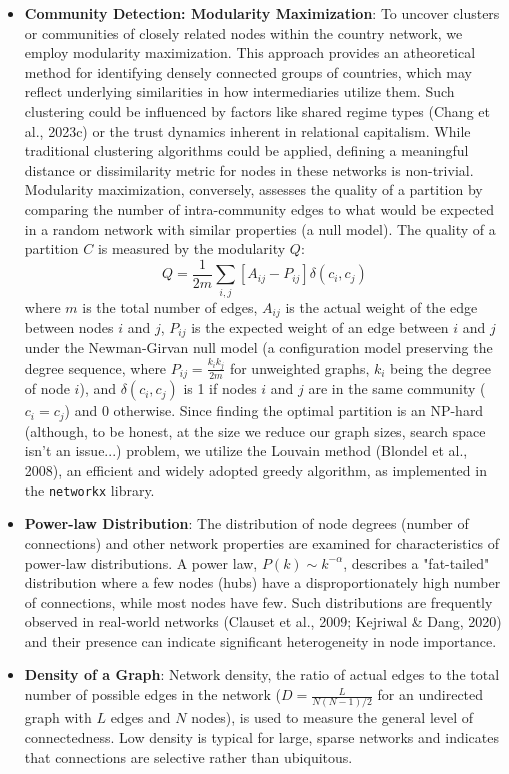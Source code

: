 \begin{itemize}
    \item \textbf{Community Detection: Modularity Maximization}: To uncover clusters or communities of closely related nodes within the country network, we employ modularity maximization. This approach provides an atheoretical method for identifying densely connected groups of countries, which may reflect underlying similarities in how intermediaries utilize them. Such clustering could be influenced by factors like shared regime types (Chang et al., 2023c) or the trust dynamics inherent in relational capitalism. While traditional clustering algorithms could be applied, defining a meaningful distance or dissimilarity metric for nodes in these networks is non-trivial. Modularity maximization, conversely, assesses the quality of a partition by comparing the number of intra-community edges to what would be expected in a random network with similar properties (a null model). The quality of a partition $C$ is measured by the modularity $Q$:
    \begin{equation}
        Q = \frac{1}{2m} \sum_{i,j} \left[ A_{ij} - P_{ij} \right] \delta(c_i, c_j)
    \end{equation}
    where $m$ is the total number of edges, $A_{ij}$ is the actual weight of the edge between nodes $i$ and $j$, $P_{ij}$ is the expected weight of an edge between $i$ and $j$ under the Newman-Girvan null model (a configuration model preserving the degree sequence, where $P_{ij} = \frac{k_i k_j}{2m}$ for unweighted graphs, $k_i$ being the degree of node $i$), and $\delta(c_i, c_j)$ is 1 if nodes $i$ and $j$ are in the same community ($c_i=c_j$) and 0 otherwise. Since finding the optimal partition is an NP-hard (although, to be honest, at the size we reduce our graph sizes, search space isn't an issue...) problem, we utilize the Louvain method (Blondel et al., 2008), an efficient and widely adopted greedy algorithm, as implemented in the \texttt{networkx} library.

    \item \textbf{Power-law Distribution}: The distribution of node degrees (number of connections) and other network properties are examined for characteristics of power-law distributions. A power law, $P(k) \sim k^{-\alpha}$, describes a "fat-tailed" distribution where a few nodes (hubs) have a disproportionately high number of connections, while most nodes have few. Such distributions are frequently observed in real-world networks (Clauset et al., 2009; Kejriwal \& Dang, 2020) and their presence can indicate significant heterogeneity in node importance.

    \item \textbf{Density of a Graph}: Network density, the ratio of actual edges to the total number of possible edges in the network ($D = \frac{L}{N(N-1)/2}$ for an undirected graph with $L$ edges and $N$ nodes), is used to measure the general level of connectedness. Low density is typical for large, sparse networks and indicates that connections are selective rather than ubiquitous.
\end{itemize}

